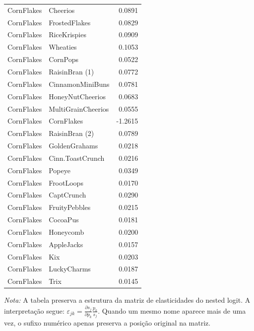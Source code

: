 \begin{table}[H]
\begin{tabular}{llr}
CornFlakes & Cheerios & 0.0891 \\
CornFlakes & FrostedFlakes & 0.0829 \\
CornFlakes & RiceKrispies & 0.0909 \\
CornFlakes & Wheaties & 0.1053 \\
CornFlakes & CornPops & 0.0522 \\
CornFlakes & RaisinBran (1) & 0.0772 \\
CornFlakes & CinnamonMiniBuns & 0.0781 \\
CornFlakes & HoneyNutCheerios & 0.0683 \\
CornFlakes & MultiGrainCheerios & 0.0555 \\
CornFlakes & CornFlakes & -1.2615 \\
CornFlakes & RaisinBran (2) & 0.0789 \\
CornFlakes & GoldenGrahams & 0.0218 \\
CornFlakes & Cinn.ToastCrunch & 0.0216 \\
CornFlakes & Popeye & 0.0349 \\
CornFlakes & FrootLoops & 0.0170 \\
CornFlakes & CaptCrunch & 0.0290 \\
CornFlakes & FruityPebbles & 0.0215 \\
CornFlakes & CocoaPus & 0.0181 \\
CornFlakes & Honeycomb & 0.0200 \\
CornFlakes & AppleJacks & 0.0157 \\
CornFlakes & Kix & 0.0203 \\
CornFlakes & LuckyCharms & 0.0187 \\
CornFlakes & Trix & 0.0145 \\
\bottomrule
\end{tabular}

\vspace{0.3em}
\footnotesize
\textit{Nota:} A tabela preserva a estrutura da matriz de elasticidades do nested logit. A interpretação segue: $\varepsilon_{jk}=\frac{\partial s_j}{\partial p_k}\frac{p_k}{s_j}$. Quando um mesmo nome aparece mais de uma vez, o sufixo numérico apenas preserva a posição original na matriz.
\end{table}
\endgroup


